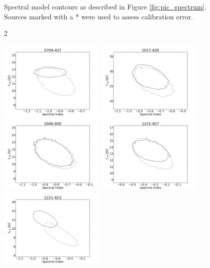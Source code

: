 \documentclass[preprint]{aastex}
\begin{document}
\begin{figure}[htbp]
\begin{center}
\end{center}
\caption{Spectral model contours as described in Figure \ref{fig:pic_spectrum}. Sources marked with a
* were used to assess calibration error.
}\label{fig:SI_contour_1}
\end{figure}
\clearpage
\begin{figure}[htbp]2\begin{center}
\includegraphics[width=2in]{plots/0704-427_SI_MCMC.png} %
\includegraphics[width=2in]{plots/1017-426_SI_MCMC.png} %
\includegraphics[width=2in]{plots/1046-409_SI_MCMC.png} %
\includegraphics[width=2in]{plots/1215-457_SI_MCMC.png} %
\includegraphics[width=2in]{plots/1221-423_SI_MCMC.png} %

\end{center}
\end{figure}
\end{document}
